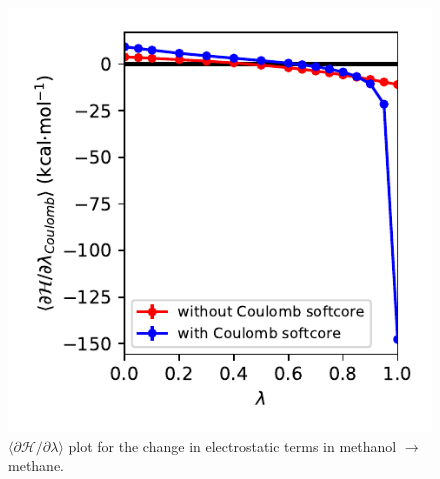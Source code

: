 \documentclass[journal=jctcce,manuscript=suppinfo]{achemso}
\begin{document}
\begin{figure}[ht]
  \includegraphics{figures/TI_plot.pdf}
  \caption{$\langle\partial\mathcal{H}/\partial\lambda\rangle$ plot for the change in electrostatic terms in methanol $\rightarrow$ methane.}
  \label{fig:gro_sc_eff}
\end{figure}


\end{document}
